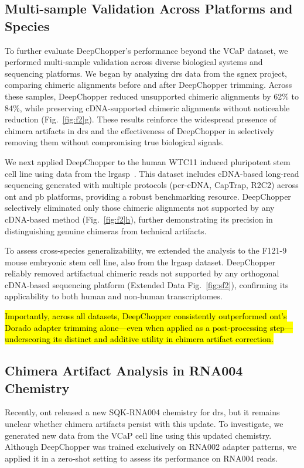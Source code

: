 \documentclass[pdflatex,sn-nature, lineno]{sn-jnl}%
\newcommand{\figref}[2]{Fig.~\hyperref[#1]{\ref*{#1}#2}}
\newcommand{\edfigref}[2]{Extended Data Fig.~\hyperref[#1]{\ref*{#1}#2}}
\begin{document}
\subsection{Multi-sample Validation Across Platforms and Species}

To further evaluate DeepChopper’s performance beyond the VCaP dataset, we performed multi-sample validation across diverse biological systems and sequencing platforms. We began by analyzing \gls{drs} data from the \gls{sgnex} project, comparing chimeric alignments before and after DeepChopper trimming. Across these samples, DeepChopper reduced unsupported chimeric alignments by 62\% to 84\%, while preserving cDNA-supported chimeric alignments without noticeable reduction (\figref{fig:f2}{g}). These results reinforce the widespread presence of chimera artifacts in \gls{drs} and the effectiveness of DeepChopper in selectively removing them without compromising true biological signals.

We next applied DeepChopper to the human WTC11 induced pluripotent stem cell line using data from the \gls{lrgasp}~\cite{pardo2024systematic}. This dataset includes cDNA-based long-read sequencing generated with multiple protocols (\gls{pcr}-cDNA, CapTrap, R2C2) across \gls{ont} and \gls{pb} platforms, providing a robust benchmarking resource. DeepChopper selectively eliminated only those chimeric alignments not supported by any cDNA-based method (\figref{fig:f2}{h}), further demonstrating its precision in distinguishing genuine chimeras from technical artifacts.

To assess cross-species generalizability, we extended the analysis to the F121-9 mouse embryonic stem cell line, also from the \gls{lrgasp} dataset. DeepChopper reliably removed artifactual chimeric reads not supported by any orthogonal cDNA-based sequencing platform (\edfigref{fig:sf2}{}), confirming its applicability to both human and non-human transcriptomes.

\hl{Importantly, across all datasets, DeepChopper consistently outperformed \mbox{\gls{ont}}’s Dorado adapter trimming alone—even when applied as a post-processing step—underscoring its distinct and additive utility in chimera artifact correction.}

\subsection{Chimera Artifact Analysis in RNA004 Chemistry}

Recently, \gls{ont} released a new SQK-RNA004 chemistry for \gls{drs}, but it remains unclear whether chimera artifacts persist with this update.
To investigate, we generated new data from the VCaP cell line using this updated chemistry. Although DeepChopper was trained exclusively on RNA002 adapter patterns, we applied it in a zero-shot setting to assess its performance on RNA004 reads.
\end{document}
